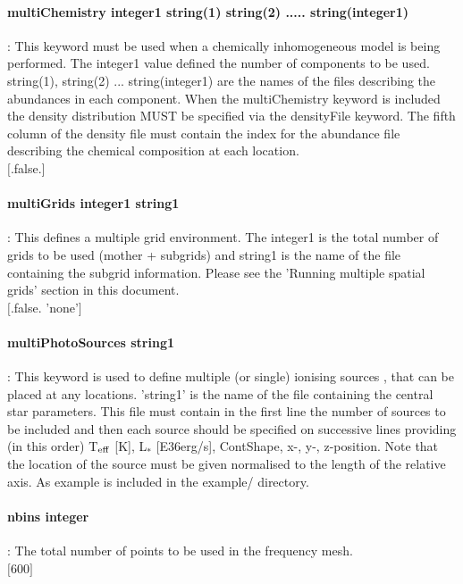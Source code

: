 \documentclass[11pt]{article}
\begin{document}
\paragraph    {multiChemistry integer1 string(1) string(2) ..... string(integer1)}: This keyword must
                     be used when a chemically inhomogeneous model is being performed. 
		     The integer1 value defined the number of components to be used. 
		     string(1), string(2) ... string(integer1) are the names of the 
		     files describing the abundances in each component. 
		     When the multiChemistry keyword is included the density distribution
		     MUST be specified via the densityFile keyword. The fifth column of the 
		     density file must contain the index for the abundance file describing 
		     the chemical composition at each location. \\
		     $[$.false.$]$\\

\paragraph    {multiGrids integer1 string1} : This defines a multiple grid environment. The integer1 is the 
                     total number of grids to be used (mother + subgrids) and string1 
                     is the name of the file containing the subgrid information. 
		     Please see the 'Running multiple spatial grids' section in this 
                     document.\\
                     $[$.false. 'none'$]$\\
                     	   
\paragraph    {multiPhotoSources string1} : This keyword is used to define multiple (or single) ionising sources , that can be placed at any locations. 'string1' is the name of the file containing the central star parameters. This file must contain in the first line the number of sources to be included and then each source should be specified on successive lines providing (in this order) T$_{\rm eff}$ [K], L$_*$ [E36erg/s], ContShape, x-, y-, z-position. Note that the location of the source must be given normalised to the length of the relative axis. As example is included in the example/ directory. \\

\paragraph    {nbins integer  }  : The total number of points to be used in the frequency mesh. \\
		     $[$600$]$\\
\end{document}
